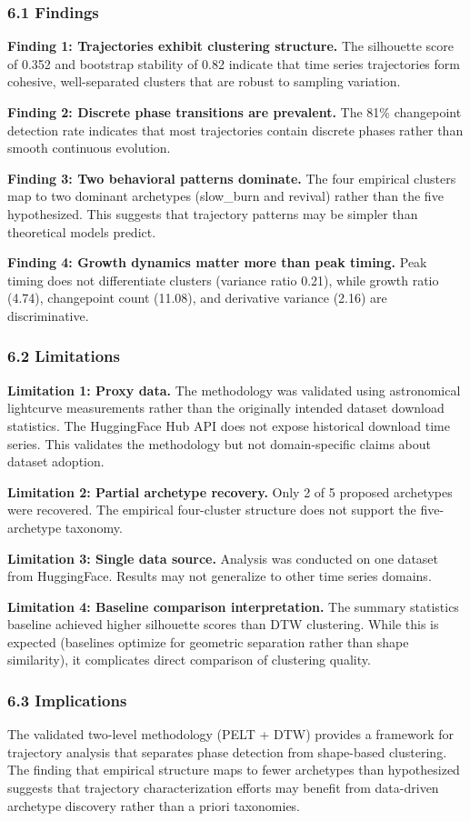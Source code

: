 
\subsubsection{6.1 Findings}

\textbf{Finding 1: Trajectories exhibit clustering structure.} The silhouette score of 0.352 and bootstrap stability of 0.82 indicate that time series trajectories form cohesive, well-separated clusters that are robust to sampling variation.

\textbf{Finding 2: Discrete phase transitions are prevalent.} The 81\% changepoint detection rate indicates that most trajectories contain discrete phases rather than smooth continuous evolution.

\textbf{Finding 3: Two behavioral patterns dominate.} The four empirical clusters map to two dominant archetypes (slow\_burn and revival) rather than the five hypothesized. This suggests that trajectory patterns may be simpler than theoretical models predict.

\textbf{Finding 4: Growth dynamics matter more than peak timing.} Peak timing does not differentiate clusters (variance ratio 0.21), while growth ratio (4.74), changepoint count (11.08), and derivative variance (2.16) are discriminative.

\subsubsection{6.2 Limitations}

\textbf{Limitation 1: Proxy data.} The methodology was validated using astronomical lightcurve measurements rather than the originally intended dataset download statistics. The HuggingFace Hub API does not expose historical download time series. This validates the methodology but not domain-specific claims about dataset adoption.

\textbf{Limitation 2: Partial archetype recovery.} Only 2 of 5 proposed archetypes were recovered. The empirical four-cluster structure does not support the five-archetype taxonomy.

\textbf{Limitation 3: Single data source.} Analysis was conducted on one dataset from HuggingFace. Results may not generalize to other time series domains.

\textbf{Limitation 4: Baseline comparison interpretation.} The summary statistics baseline achieved higher silhouette scores than DTW clustering. While this is expected (baselines optimize for geometric separation rather than shape similarity), it complicates direct comparison of clustering quality.

\subsubsection{6.3 Implications}

The validated two-level methodology (PELT + DTW) provides a framework for trajectory analysis that separates phase detection from shape-based clustering. The finding that empirical structure maps to fewer archetypes than hypothesized suggests that trajectory characterization efforts may benefit from data-driven archetype discovery rather than a priori taxonomies.
